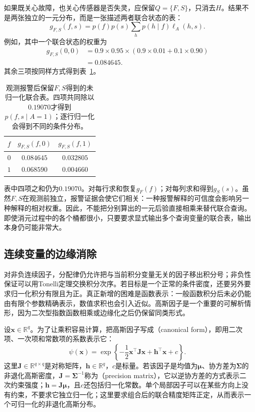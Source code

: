 如果既关心故障，也关心传感器是否失灵，应保留$Q=\{F,S\}$，只消去$H$。结果不是两张独立的一元分布，而是一张描述两者联合状态的表：
\begin{equation}
  g_{F,S}(f,s)
  =p(f)p(s)\sum_h p(h\mid f)\ell_A(h,s).
  \label{eq:pgm-elimination-joint-query}
\end{equation}
例如，其中一个联合状态的权重为
\[
  \begin{aligned}
    g_{F,S}(0,0)
    &=0.9\times0.95\times(0.9\times0.01+0.1\times0.90)\\
    &=0.084645.
  \end{aligned}
\]
其余三项按同样方式得到表~\ref{tab:pgm-elimination-joint-query}。

\begin{table}[htbp]
  \centering
  \begin{tabular}{ccc}
    \toprule
    $f$ & $g_{F,S}(f,0)$ & $g_{F,S}(f,1)$\\
    \midrule
    $0$ & $0.084645$ & $0.032805$\\
    $1$ & $0.068590$ & $0.004660$\\
    \bottomrule
  \end{tabular}
  \caption{观测报警后保留$F,S$得到的未归一化联合表。四项共同除以$0.19070$才得到$p(f,s\mid A=1)$；逐行归一化会得到不同的条件分布。}
  \label{tab:pgm-elimination-joint-query}
\end{table}

表中四项之和仍为$0.19070$。对每行求和恢复$g_F(f)$；对每列求和得到$g_S(s)$。虽然$F,S$在观测前独立，报警证据会使它们相关：一种报警解释的可信度会影响另一种解释的相对权重。因此，不能把分别算出的一元后验直接相乘来替代联合查询。即使消元过程中的各个桶都很小，只要要求显式输出多个查询变量的联合表，输出本身仍可能非常大。

\subsection{连续变量的边缘消除}
\label{sec:pgm-elimination-gaussian}

对非负连续因子，分配律仍允许把与当前积分变量无关的因子移出积分号；非负性保证可以用Tonelli定理交换积分次序。若目标是一个正常的条件密度，还要另外要求归一化积分有限且为正。真正新增的困难是函数表示：一般函数积分后未必仍能由有限个参数精确表示，数值求积也会引入近似。高斯因子是一个重要的可解析情形，因为二次型指数函数相乘或边缘化之后仍保留同类形式。

设$\bm{x}\in\mathbb{R}^{q}$。为了让乘积容易计算，把高斯因子写成（canonical form），即用二次项、一次项和常数项的系数表示它：
\begin{equation}
  \psi(\bm{x})
  =\exp\!\left\{-\frac12\bm{x}^{\top}\bm{J}\bm{x}
                  +\bm{h}^{\top}\bm{x}+c\right\}.
  \label{eq:pgm-elimination-gaussian-canonical}
\end{equation}
这里$\bm{J}\in\mathbb{R}^{q\times q}$是对称矩阵，$\bm{h}\in\mathbb{R}^{q}$，$c$是标量。若该因子是均值为$\bm{\mu}$、协方差为$\bm{\Sigma}$的非退化高斯密度，$\bm{J}=\bm{\Sigma}^{-1}$称为（precision matrix），它以逆协方差的方式表示二次约束强度；$\bm{h}=\bm{J}\bm{\mu}$，且$c$还包括归一化常数。单个局部因子可以在某些方向上没有约束，不要求它独立归一化；这里要求组合后的联合精度矩阵正定，从而表示一个可归一化的非退化高斯分布。

